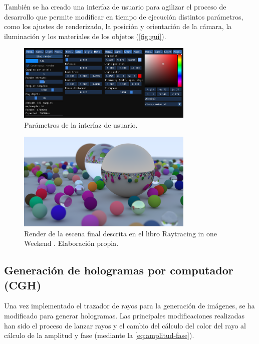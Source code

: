 \documentclass[10pt, a4paper]{article}
\begin{document}
También se ha creado una interfaz de usuario para agilizar el proceso de desarrollo que permite modificar en tiempo de ejecución distintos parámetros, como los ajustes de renderizado, la posición y orientación de la cámara, la iluminación y los materiales de los objetos (\autoref{fig:gui}).

\begin{figure}[H]
    \centering 
    \includegraphics[width=0.75\textwidth]{gui_parameters}
    \caption{Parámetros de la interfaz de usuario.}
    \label{fig:gui}
\end{figure}

\begin{figure}[H]
    \centering 
    \includegraphics[width=0.75\textwidth]{06_end_book_1}
    \caption{Render de la escena final descrita en el libro Raytracing in one Weekend \cite{Shirley:2024}. Elaboración propia.}
    \label{fig:render-final}
\end{figure}

\subsection{Generación de hologramas por computador (CGH)}

Una vez implementado el trazador de rayos para la generación de imágenes, se ha modificado para generar hologramas. Las principales modificaciones realizadas han sido el proceso de lanzar rayos y el cambio del cálculo del color del rayo al cálculo de la amplitud y fase (mediante la \autoref{eq:amplitud-fase}).
\end{document}
